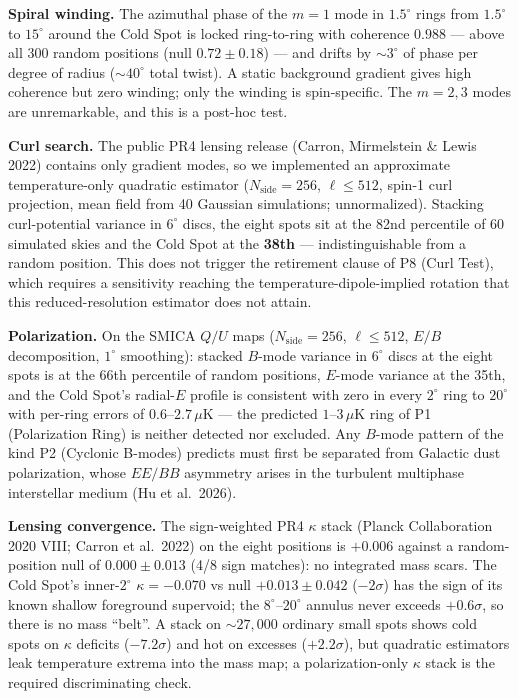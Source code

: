 \documentclass[
  11pt,
]{article}
\begin{document}
\textbf{Spiral winding.} The azimuthal phase of the \(m = 1\) mode in
\(1.5^\circ\) rings from \(1.5^\circ\) to \(15^\circ\) around the Cold
Spot is locked ring-to-ring with coherence \(0.988\) --- above all 300
random positions (null \(0.72 \pm 0.18\)) --- and drifts by
\(\sim\!3^\circ\) of phase per degree of radius (\(\sim\!40^\circ\)
total twist). A static background gradient gives high coherence but zero
winding; only the winding is spin-specific. The \(m = 2, 3\) modes are
unremarkable, and this is a post-hoc test.

\textbf{Curl search.} The public PR4 lensing release (Carron,
Mirmelstein \& Lewis 2022) contains only gradient modes, so we
implemented an approximate temperature-only quadratic estimator
(\(N_{\text{side}} = 256\), \(\ell \leq 512\), spin-1 curl projection,
mean field from 40 Gaussian simulations; unnormalized). Stacking
curl-potential variance in \(6^\circ\) discs, the eight spots sit at the
82nd percentile of 60 simulated skies and the Cold Spot at the
\textbf{38th} --- indistinguishable from a random position. This does
not trigger the retirement clause of P8 (Curl Test), which requires a
sensitivity reaching the temperature-dipole-implied rotation that this
reduced-resolution estimator does not attain.

\textbf{Polarization.} On the SMICA \(Q/U\) maps
(\(N_{\text{side}} = 256\), \(\ell \leq 512\), \(E/B\) decomposition,
\(1^\circ\) smoothing): stacked \(B\)-mode variance in \(6^\circ\) discs
at the eight spots is at the 66th percentile of random positions,
\(E\)-mode variance at the 35th, and the Cold Spot's radial-\(E\)
profile is consistent with zero in every \(2^\circ\) ring to
\(20^\circ\) with per-ring errors of \(0.6\)--\(2.7\,\mu\)K --- the
predicted \(1\)--\(3\,\mu\)K ring of P1 (Polarization Ring) is neither
detected nor excluded. Any \(B\)-mode pattern of the kind P2 (Cyclonic
B-modes) predicts must first be separated from Galactic dust
polarization, whose \(EE/BB\) asymmetry arises in the turbulent
multiphase interstellar medium (Hu et al.~2026).

\textbf{Lensing convergence.} The sign-weighted PR4 \(\kappa\) stack
(Planck Collaboration 2020 VIII; Carron et al.~2022) on the eight
positions is \(+0.006\) against a random-position null of
\(0.000 \pm 0.013\) (4/8 sign matches): no integrated mass scars. The
Cold Spot's inner-\(2^\circ\) \(\kappa = -0.070\) vs null
\(+0.013 \pm 0.042\) (\(-2\sigma\)) has the sign of its known shallow
foreground supervoid; the \(8^\circ\)--\(20^\circ\) annulus never
exceeds \(+0.6\sigma\), so there is no mass ``belt''. A stack on
\(\sim\!27{,}000\) ordinary small spots shows cold spots on \(\kappa\)
deficits (\(-7.2\sigma\)) and hot on excesses (\(+2.2\sigma\)), but
quadratic estimators leak temperature extrema into the mass map; a
polarization-only \(\kappa\) stack is the required discriminating check.
\end{document}
